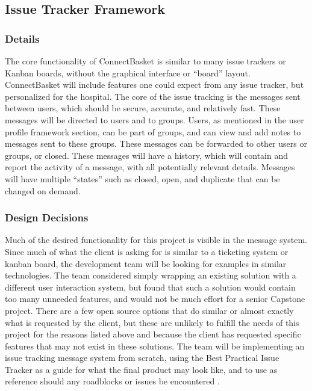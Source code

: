 \documentclass[onecolumn, draftclsnofoot,10pt, compsoc]{IEEEtran}
\begin{document}
\subsection{Issue Tracker Framework}

\subsubsection{Details}
The core functionality of ConnectBasket is similar to many issue trackers or Kanban boards, without the graphical interface or “board” layout. ConnectBasket will include features one could expect from any issue tracker, but personalized for the hospital. The core of the issue tracking is the messages sent between users, which should be secure, accurate, and relatively fast. These messages will be directed to users and to groups. Users, as mentioned in the user profile framework section, can be part of groups, and can view and add notes to messages sent to these groups. These messages can be forwarded to other users or groups, or closed. These messages will have a history, which will contain and report the activity of a message, with all potentially relevant details. Messages will have multiple “states” such as closed, open, and duplicate that can be changed on demand.


\subsubsection{Design Decisions}
Much of the desired functionality for this project is visible in the message system. Since much of what the client is asking for is similar to a ticketing system or kanban board, the development team will be looking for examples in similar technologies. The team considered simply wrapping an existing solution with a different user interaction system, but found that such a solution would contain too many unneeded features, and would not be much effort for a senior Capstone project. There are a few open source options that do similar or almost exactly what is requested by the client, but these are unlikely to fulfill the needs of this project for the reasons listed above and because the client has requested specific features that may not exist in these solutions. The team will be implementing an issue tracking message system from scratch, using the Best Practical Issue Tracker as a guide for what the final product may look like, and to use as reference should any roadblocks or issues be encountered \cite{bestpractical}.
\end{document}
